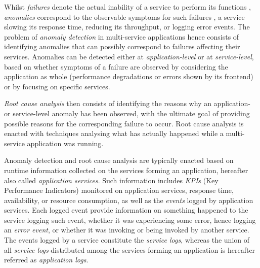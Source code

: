 Whilst \textit{failures} denote the actual inability of a service to perform its functions \cite{Saltzer2009_PrinciplesComputerSystemDesign}, \textit{anomalies} correspond to the observable symptoms for such failures \cite{29_Wang2018_CloudRanger}, \eg a service slowing its response time, reducing its throughput, or logging error events.   
The problem of \textit{anomaly detection} in multi-service applications hence consists of identifying anomalies that can possibly correspond to failures affecting their services.
Anomalies can be detected either at \textit{application-level} or at \textit{service-level}, based on whether symptoms of a failure are observed by considering the application as whole (\eg performance degradations or errors shown by its frontend) or by focusing on specific services.  

\textit{Root cause analysis} then consists of identifying the reasons why an application- or service-level anomaly has been observed, with the ultimate goal of providing possible reasons for the corresponding failure to occur.
Root cause analysis is enacted with techniques analysing what has actually happened while a multi-service application was running.

Anomaly detection and root cause analysis are typically enacted based on runtime information collected on the services forming an application, hereafter also called \textit{application services}. 
Such information includes \textit{KPIs} (Key Performance Indicators) monitored on application services, \eg response time, availability, or resource consumption, as well as the \textit{events} logged by application services.
Each logged event provide information on something happened to the service logging such event, \eg whether it was experiencing some error, hence logging an \textit{error event}, or whether it was invoking or being invoked by another service.
The events logged by a service constitute the \textit{service logs}, whereas the union of all \textit{service logs} distributed among the services forming an application is hereafter referred as \textit{application logs}.

